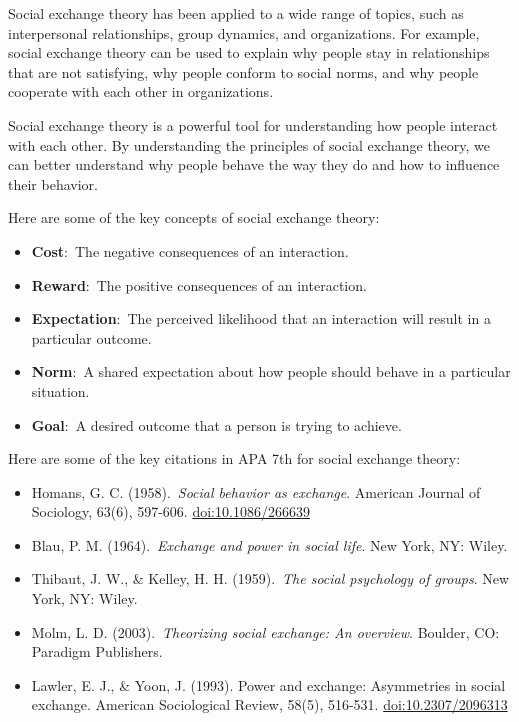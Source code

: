 \documentclass[
]{book}
\begin{document}
Social exchange theory has been applied to a wide range of topics, such as interpersonal relationships, group dynamics, and organizations. For example, social exchange theory can be used to explain why people stay in relationships that are not satisfying, why people conform to social norms, and why people cooperate with each other in organizations.

Social exchange theory is a powerful tool for understanding how people interact with each other. By understanding the principles of social exchange theory, we can better understand why people behave the way they do and how to influence their behavior.

Here are some of the key concepts of social exchange theory:

\begin{itemize}
\item
  \textbf{Cost}:~The negative consequences of an interaction.
\item
  \textbf{Reward}:~The positive consequences of an interaction.
\item
  \textbf{Expectation}:~The perceived likelihood that an interaction will result in a particular outcome.
\item
  \textbf{Norm}:~A shared expectation about how people should behave in a particular situation.
\item
  \textbf{Goal}:~A desired outcome that a person is trying to achieve.
\end{itemize}

Here are some of the key citations in APA 7th for social exchange theory:

\begin{itemize}
\item
  Homans, G. C. (1958).~\emph{Social behavior as exchange}. American Journal of Sociology, 63(6), 597-606. \url{doi:10.1086/266639}
\item
  Blau, P. M. (1964).~\emph{Exchange and power in social life}. New York, NY: Wiley.
\item
  Thibaut, J. W., \& Kelley, H. H. (1959).~\emph{The social psychology of groups}. New York, NY: Wiley.
\item
  Molm, L. D. (2003).~\emph{Theorizing social exchange: An overview}. Boulder, CO: Paradigm Publishers.
\item
  Lawler, E. J., \& Yoon, J. (1993). Power and exchange: Asymmetries in social exchange. American Sociological Review, 58(5), 516-531. \url{doi:10.2307/2096313}
\end{itemize}
\end{document}
